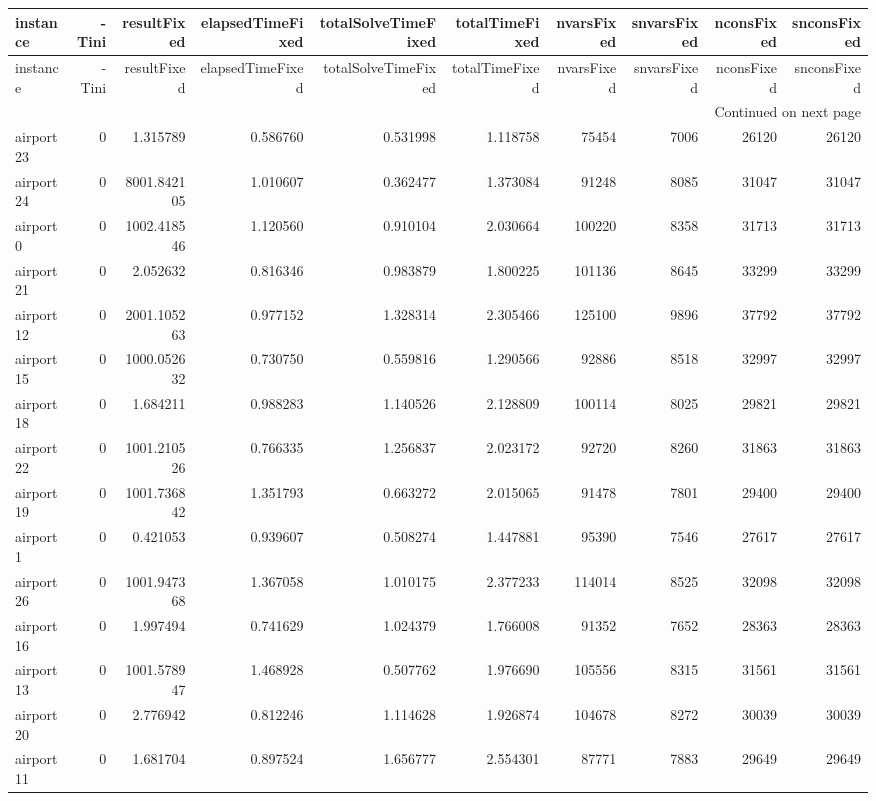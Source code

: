 
\begin{longtable}{|l|r|r|r|r|r|r|r|r|r|}
\toprule
instance & -Tini & resultFixed & elapsedTimeFixed & totalSolveTimeFixed & totalTimeFixed & nvarsFixed & snvarsFixed & nconsFixed & snconsFixed \\
\midrule
\endfirsthead
\toprule
instance & -Tini & resultFixed & elapsedTimeFixed & totalSolveTimeFixed & totalTimeFixed & nvarsFixed & snvarsFixed & nconsFixed & snconsFixed \\
\midrule
\endhead
\midrule
\multicolumn{10}{r}{Continued on next page} \\
\midrule
\endfoot
\bottomrule
\endlastfoot
airport23 & 0 & 1.315789 & 0.586760 & 0.531998 & 1.118758 & 75454 & 7006 & 26120 & 26120 \\
airport24 & 0 & 8001.842105 & 1.010607 & 0.362477 & 1.373084 & 91248 & 8085 & 31047 & 31047 \\
airport0 & 0 & 1002.418546 & 1.120560 & 0.910104 & 2.030664 & 100220 & 8358 & 31713 & 31713 \\
airport21 & 0 & 2.052632 & 0.816346 & 0.983879 & 1.800225 & 101136 & 8645 & 33299 & 33299 \\
airport12 & 0 & 2001.105263 & 0.977152 & 1.328314 & 2.305466 & 125100 & 9896 & 37792 & 37792 \\
airport15 & 0 & 1000.052632 & 0.730750 & 0.559816 & 1.290566 & 92886 & 8518 & 32997 & 32997 \\
airport18 & 0 & 1.684211 & 0.988283 & 1.140526 & 2.128809 & 100114 & 8025 & 29821 & 29821 \\
airport22 & 0 & 1001.210526 & 0.766335 & 1.256837 & 2.023172 & 92720 & 8260 & 31863 & 31863 \\
airport19 & 0 & 1001.736842 & 1.351793 & 0.663272 & 2.015065 & 91478 & 7801 & 29400 & 29400 \\
airport1 & 0 & 0.421053 & 0.939607 & 0.508274 & 1.447881 & 95390 & 7546 & 27617 & 27617 \\
airport26 & 0 & 1001.947368 & 1.367058 & 1.010175 & 2.377233 & 114014 & 8525 & 32098 & 32098 \\
airport16 & 0 & 1.997494 & 0.741629 & 1.024379 & 1.766008 & 91352 & 7652 & 28363 & 28363 \\
airport13 & 0 & 1001.578947 & 1.468928 & 0.507762 & 1.976690 & 105556 & 8315 & 31561 & 31561 \\
airport20 & 0 & 2.776942 & 0.812246 & 1.114628 & 1.926874 & 104678 & 8272 & 30039 & 30039 \\
airport11 & 0 & 1.681704 & 0.897524 & 1.656777 & 2.554301 & 87771 & 7883 & 29649 & 29649 \\

\end{longtable}
